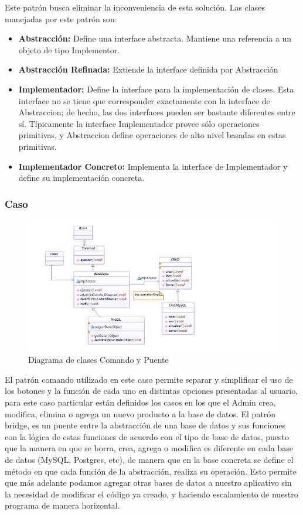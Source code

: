 Este patrón busca eliminar la inconveniencia de esta solución. Las clases manejadas por este patrón son:
\begin{itemize}
	\item \textbf{Abstracción: }Define una interface abstracta. Mantiene una referencia a un objeto de tipo Implementor.
	\item \textbf{Abstracción Refinada: }Extiende la interface definida por Abstracción 
	\item \textbf{Implementador: }Define la interface para la implementación de clases. Esta interface no se tiene que corresponder exactamente con la interface de Abstraccion; de hecho, las dos interfaces pueden ser bastante diferentes entre sí. Típicamente la interface Implementador provee sólo operaciones primitivas, y Abstraccion define operaciones de alto nivel basadas en estas primitivas.
	\item \textbf{Implementador Concreto: }Implementa la interface de Implementador y define su implementación concreta.
\end{itemize}

\subsubsection{Caso}

\begin{figure}[th!]
\centering
\includegraphics[width=1.0\linewidth]{arquitectura/imagenes/DiagramaComandoYPuente}
\caption{Diagrama de clases  Comando y Puente}
\end{figure}



El patrón comando utilizado en este caso permite separar y simplificar el uso de los botones y la función de cada uno en distintas opciones presentadas al usuario, para este caso particular están definidos los casos en los que el Admin crea, modifica, elimina o agrega un nuevo producto a la base de datos.
El patrón bridge, es un puente entre la abstracción de una base de datos y sus funciones con la lógica de estas funciones de acuerdo con el tipo de base de datos, puesto que la manera en que se borra, crea, agrega o modifica es diferente en cada base de datos (MySQL, Postgres, etc), de manera que en la base concreta se define el método en que cada función de la abstracción, realiza su operación. Esto permite que más adelante podamos agregar otras bases de datos a nuestro aplicativo sin la necesidad de modificar el código ya creado, y haciendo escalamiento de nuestro programa de manera horizontal.

